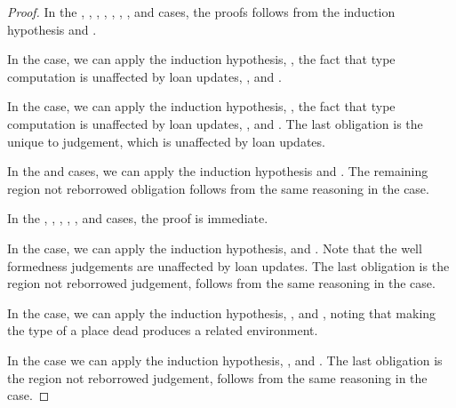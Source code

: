 \begin{proof}
  In the , , ,
  , , , , and
   cases, the proofs follows from the induction hypothesis and
  .

  In the  case, we can apply the induction hypothesis,
  , the fact that type computation is
  unaffected by loan updates, , and
  .

  In the  case, we can apply the induction hypothesis,
  , the fact that type computation is
  unaffected by loan updates, , and
  . The last obligation is the unique
  to judgement, which is unaffected by loan updates.

  In the  and  cases, we can apply the
  induction hypothesis and . The
  remaining region not reborrowed obligation follows from the same reasoning in
  the  case.

  In the , , , ,
  , and  cases, the proof is immediate.

  In the  case, we can apply the induction hypothesis,
   and
  . Note that the well formedness judgements
  are unaffected by loan updates. The last obligation is the region not
  reborrowed judgement, follows from the same reasoning in
  the  case.

  In the  case, we can apply the induction hypothesis,
  , and
  , noting that making the type of a
  place dead produces a related environment.

  In the  case we can apply the induction hypothesis,
  , and
  . The last obligation is the region not
  reborrowed judgement, follows from the same reasoning in
  the  case.
\end{proof}

